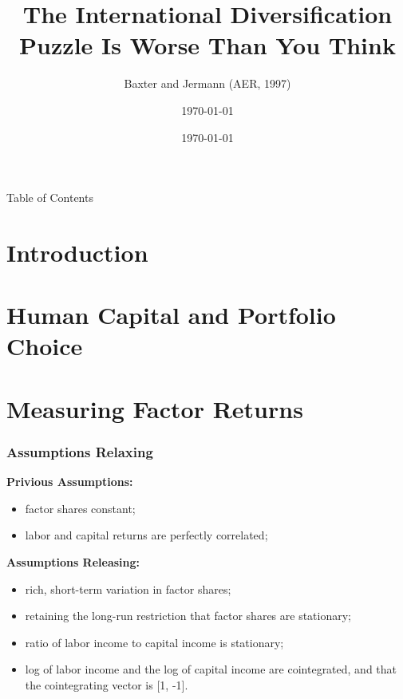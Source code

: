 \documentclass[10pt]{beamer}
\begin{document}
\title{The International Diversification Puzzle Is Worse Than You Think}
\subtitle{Baxter and Jermann (AER, 1997)}
\author[Baxter and Jermann (AER, 1997)]{\today}
\date{\today}

\begin{frame}[plain]
  \titlepage
\end{frame}


\begin{frame}{Table of Contents}
  \tableofcontents
\end{frame}
\section{Introduction}
\section[Human Capital]{Human Capital and Portfolio Choice}
\section[Measuring]{Measuring Factor Returns}
\begin{frame}[c]\frametitle{Assumptions Relaxing}
\textbf{Privious Assumptions:}
\begin{itemize}
    \item factor shares constant;
    \item labor and capital returns are \alert{perfectly correlated};
\end{itemize}

\textbf{Assumptions Releasing:}
\begin{itemize}
    \item rich, short-term variation in factor shares;
    \item retaining the long-run restriction that factor shares are stationary;
    \item ratio of labor income to capital income is stationary;
    \item log of labor income and the log of capital income are cointegrated, and that the cointegrating vector is [1, -1].
\end{itemize}

\end{frame}
\end{document}
